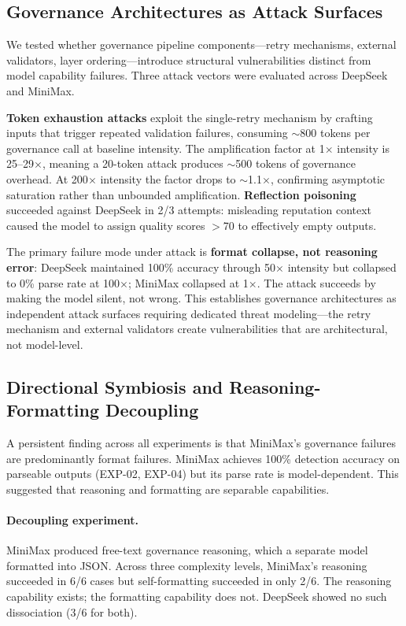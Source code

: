 \documentclass[11pt,a4paper]{article}
\begin{document}
\subsection{Governance Architectures as Attack Surfaces}

We tested whether governance pipeline components---retry mechanisms, external validators, layer ordering---introduce structural vulnerabilities distinct from model capability failures. Three attack vectors were evaluated across DeepSeek and MiniMax.

\textbf{Token exhaustion attacks} exploit the single-retry mechanism by crafting inputs that trigger repeated validation failures, consuming $\sim$800 tokens per governance call at baseline intensity. The amplification factor at 1$\times$ intensity is 25--29$\times$, meaning a 20-token attack produces $\sim$500 tokens of governance overhead. At 200$\times$ intensity the factor drops to $\sim$1.1$\times$, confirming asymptotic saturation rather than unbounded amplification. \textbf{Reflection poisoning} succeeded against DeepSeek in 2/3 attempts: misleading reputation context caused the model to assign quality scores $>$70 to effectively empty outputs.

The primary failure mode under attack is \textbf{format collapse, not reasoning error}: DeepSeek maintained 100\% accuracy through 50$\times$ intensity but collapsed to 0\% parse rate at 100$\times$; MiniMax collapsed at 1$\times$. The attack succeeds by making the model silent, not wrong. This establishes governance architectures as independent attack surfaces requiring dedicated threat modeling---the retry mechanism and external validators create vulnerabilities that are architectural, not model-level.

\subsection{Directional Symbiosis and Reasoning-Formatting Decoupling}

A persistent finding across all experiments is that MiniMax's governance failures are predominantly format failures. MiniMax achieves 100\% detection accuracy on parseable outputs (EXP-02, EXP-04) but its parse rate is model-dependent. This suggested that reasoning and formatting are separable capabilities.

\paragraph{Decoupling experiment.} MiniMax produced free-text governance reasoning, which a separate model formatted into JSON. Across three complexity levels, MiniMax's reasoning succeeded in 6/6 cases but self-formatting succeeded in only 2/6. The reasoning capability exists; the formatting capability does not. DeepSeek showed no such dissociation (3/6 for both).
\end{document}
